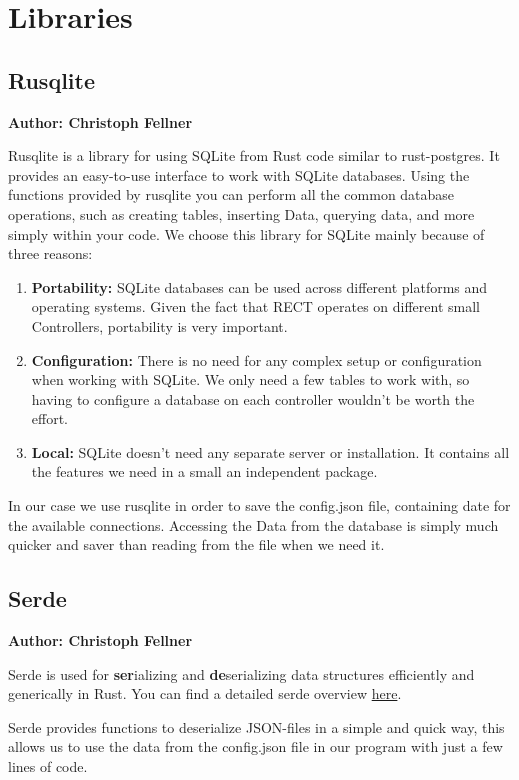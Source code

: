 \section{Libraries}

\subsection{Rusqlite}
\textbf{Author: Christoph Fellner}

Rusqlite is a library for using SQLite from Rust code similar to rust-postgres. It provides an easy-to-use interface to work with SQLite databases. Using the functions provided by rusqlite you can perform all the common database operations, such as creating tables, inserting Data, querying data, and more simply within your code. 
We choose this library for SQLite mainly because of three reasons:
\begin{enumerate}
    \item \textbf{Portability:} SQLite databases can be used across different platforms and operating systems. Given the fact that RECT operates on different small Controllers, portability is very important.
    \item \textbf{Configuration:} There is no need for any complex setup or configuration when working with SQLite. We only need a few tables to work with, so having to configure a database on each controller wouldn't be worth the effort.
    \item \textbf{Local:} SQLite doesn't need any separate server or installation. It contains all the features we need in a small an independent package.
\end{enumerate}

In our case we use rusqlite in order to save the config.json file, containing date for the available connections. Accessing the Data from the database is simply much quicker and saver than reading from the file when we need it. 

\subsection{Serde}
\textbf{Author: Christoph Fellner}

Serde is used for \textbf{ser}ializing and \textbf{de}serializing data structures efficiently and generically in Rust. You can find a detailed serde overview \href{https://serde.rs/}{here}.

Serde provides functions to deserialize JSON-files in a simple and quick way, this allows us to use the data from the config.json file in our program with just a few lines of code.

